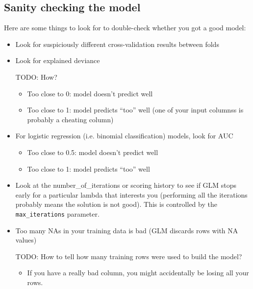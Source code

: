 \subsection{Sanity checking the model}

Here are some things to look for to double-check whether you got a good model:

\begin{itemize}
\item Look for suspiciously different cross-validation results between folds

\waterExampleInR


\item Look for explained deviance

TODO: How?

      \begin{itemize}
      \item Too close to 0:  model doesn’t predict well
      \item Too close to 1:  model predicts “too” well (one of your input columnss is probably a cheating column)
      \end{itemize}
\item For logistic regression (i.e. binomial classification) models, look for AUC
      \begin{itemize}
      \item Too close to 0.5:  model doesn’t predict well
      \item Too close to 1:  model predicts “too” well
      \end{itemize}
\item Look at the number\_of\_iterations or scoring history to see if GLM stops early for a particular
      lambda that interests you (performing all the iterations probably means the solution is not good).  This is
      controlled by the \texttt{max\_iterations} parameter.
\item Too many NAs in your training data is bad (GLM discards rows with NA values)

TODO: How to tell how many training rows were used to build the model?

      \begin{itemize}
      \item If you have a really bad column, you might accidentally be losing all your rows.
      \end{itemize}
\end{itemize}

